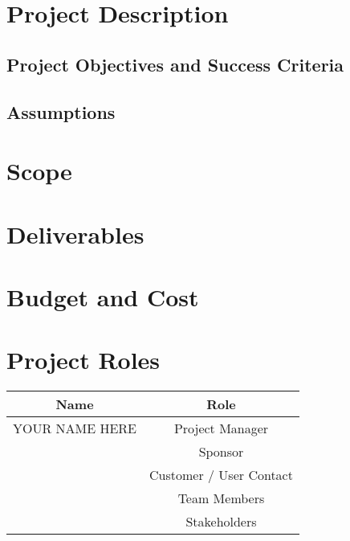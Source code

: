 \documentclass[12pt]{charter}
\begin{document}
\maketitle
\newpage

\section*{Project Description}
\label{sec:description}

	\subsection*{Project Objectives and Success Criteria}
	\label{subsec:objandsuccess}
	
	\subsection*{Assumptions}
	\label{subsec:assumptions}

\section*{Scope}
\label{sec:scope}

\section*{Deliverables}
\label{sec:deliverables}

\section*{Budget and Cost}
\label{sec:budgetcost}

\section*{Project Roles}
\label{sec:roles}
\begin{table}[h]
  \label{tbl:roles}
  \begin{center}
    \begin{tabular}{c|c}
      Name & Role\\\hline
      YOUR NAME HERE & Project Manager\\\hline
      & Sponsor\\\hline
      & Customer / User Contact\\\hline
      & Team Members\\\hline
      & Stakeholders\\\hline
    \end{tabular}
  \end{center}
\end{table}
\end{document}
